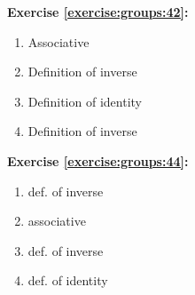 \noindent\textbf{Exercise \ref{exercise:groups:42}:}\\
\begin{multicols}{2}
\begin{enumerate}
\item
Associative

\item
Definition  of  inverse

\item
Definition of  identity

\item
Definition  of  inverse
\end{enumerate}
\end{multicols}

\noindent\textbf{Exercise \ref{exercise:groups:44}:}
\begin{multicols}{2}
\begin{enumerate}
\item
def. of inverse

\item
associative

\item
def. of inverse

\item
def. of identity
\end{enumerate}
\end{multicols}

